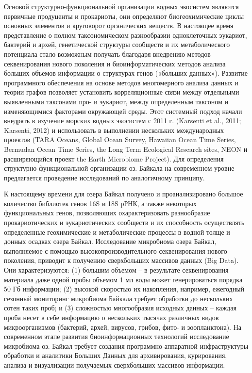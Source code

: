 \documentclass[a4paper,12pt,openany,final]{extreport}
\begin{document}
Основой структурно-функциональной организации водных экосистем являются
первичные продуценты и прокариоты, они определяют биогеохимические циклы
основных элементов и круговорот органических веществ. В настоящее время
представление о полном таксономическом разнообразии одноклеточных
эукариот, бактерий и архей, генетической структуры сообществ и их
метаболического потенциала стало возможным получать благодаря внедрению
методов секвенирования нового поколения и биоинформатических методов
анализа больших объемов информации о структурах генов («больших
данных»). Развитие программного обеспечения на основе методов
многомерного анализа данных и теории графов позволяет установить
корреляционные связи между отдельными выявленными таксонами про- и
эукариот, между определенным таксоном и изменяющимися факторами
окружающей среды. Этот системный подход начали внедрять в изучение
морских водных экосистем с 2011 г. (Karsenti et al., 2011; Karsenti,
2012) и использовать в выполнении нескольких международных проектов
(TARA Oceans, Global Ocean Survey, Hawaiian Ocean Time Series, Bermudan
Ocean Time Series, the Long Term Ecological Research sites, NEON и
расширяющийся проект the Earth Microbiome Project). Для определения
структурно-функциональной организации оз. Байкала на современном уровне
предлагается проведение исследований по аналогичному принципу.

К настоящему времени для озера Байкал получено и проанализировано
большое количество библиотек генов 16S и 18S рРНК, а также некоторых
функциональных генов, позволяющих охарактеризовать разнообразие
прокариотических и эукариотических сообществ и их способность
осуществлять определенные геохимические и метаболические процессы в
водной толще и донных осадках озера Байкал. Исследование микробиома
озера Байкал, выполняемое с помощью высокопроизводительного
секвенирования нового поколения, приводит к получению сверхбольших
массивов данных (Big Data). Они характеризуются: (1) большим объемом --
в результате секвенирования материала даже одной пробы объемом 1 мл воды
может генерироваться порядка 50 Гб информации; (2) высокой скоростью их
накопления, например, ежегодный сезонный мониторинг микробиома Байкала
требует обработки до нескольких сотен таких проб; и (3) сложностью
многообразия исходных данных -- каждая проба несет в себе информацию о
нескольких тысячах различных видов микроорганизмов (бактерий, архей,
вирусов, грибов, фито- и зоопланктона). На современном этапе развития
биоинформационных технологий исследование микробиома оз. Байкал требует
создания программно-аппаратной инфраструктуры обработки и аналитики
Больших Данных для архивирования, курирования, анализа и визуализации
получаемых сверхбольших массивов информации.
\end{document}

